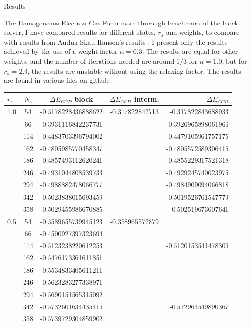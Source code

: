 \documentclass[twoside,english]{uiofysmaster}
\begin{document}
\begin{chapter}{Results}
\begin{section}{The Homogeneous Electron Gas}
		For a more thurough benchmark of the block solver, I have compared results for different states, $r_s$ and weights, to compare with results from Audun Skau Hansen's results \cite{Audun}. I present only the results achieved by the use of a weight factor $\alpha = 0.3$. The results are equal for other weights, and the number of iterations needed are around $1/3$ for $\alpha = 1.0$, but for $r_s = 2.0$, the results are unstable without using the relaxing factor. The results are found in various files on github \cite{WholmenGithub}.
		\begin{table}[H]
			\begin{center}
				\begin{tabular}[center]{l  c  c  c r}
					$r_s$ & $N_{\text{s}}$ & $\Delta E_{CCD}$ block & $\Delta E_{CCD}$ interm. & $\Delta E_{CCD}$ \cite{Audun} \\
					\hline
					1.0 &  54 & -0.3178228436888622 & -0.317822842713 & -0.317822843688933 \\
						&  66 & -0.3931116842237731 & & -0.3926965898061966 \\
						& 114 & -0.4483703396794002 & & -0.4479105961757175 \\
						& 162 & -0.4805985770458347 & & -0.4805572589306416 \\
						& 186 & -0.4857493112620241 & & -0.4855229317521318 \\
						& 246 & -0.4931044808539733 & & -0.4929245740023975 \\
						& 294 & -0.4988882478066777 & & -0.4984909094066818 \\
						& 342 & -0.5023838015693459 & & -0.5019526761547779 \\
						& 358 & -0.5029455986670885 & & -0.502519673607641\\
					\hline
					0.5 &  54 & -0.3589655739945123 & -0.358965572879 &   \\
						&  66 & -0.4500927397323694 &  & \\
						& 114 & -0.5123238220612253 &  & -0.5120153541478306 \\
						& 162 & -0.5476173361611851 &  & \\
						& 186 & -0.5534833405611211 &  & \\
						& 246 & -0.5623283277338971 &  & \\
						& 294 & -0.5690151565315092 &  & \\
						& 342 & -0.5732601634435416 &  & -0.572964549890367 \\
						& 358 & -0.5739729304859902 &  & \\

\end{tabular}
\end{center}
\end{table}
\end{section}
\end{chapter}
\end{document}
